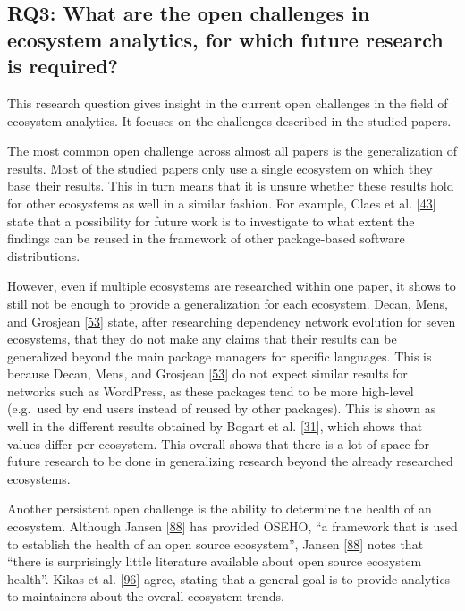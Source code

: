 \documentclass[]{book}
\begin{document}
\subsection{RQ3: What are the open challenges in ecosystem analytics,
for which future research is
required?}\label{rq3-what-are-the-open-challenges-in-ecosystem-analytics-for-which-future-research-is-required}

This research question gives insight in the current open challenges in
the field of ecosystem analytics. It focuses on the challenges described
in the studied papers.

The most common open challenge across almost all papers is the
generalization of results. Most of the studied papers only use a single
ecosystem on which they base their results. This in turn means that it
is unsure whether these results hold for other ecosystems as well in a
similar fashion. For example, Claes et al.
{[}\protect\hyperlink{ref-Claes2015}{43}{]} state that a possibility for
future work is to investigate to what extent the findings can be reused
in the framework of other package-based software distributions.

However, even if multiple ecosystems are researched within one paper, it
shows to still not be enough to provide a generalization for each
ecosystem. Decan, Mens, and Grosjean
{[}\protect\hyperlink{ref-Decan2018}{53}{]} state, after researching
dependency network evolution for seven ecosystems, that they do not make
any claims that their results can be generalized beyond the main package
managers for specific languages. This is because Decan, Mens, and
Grosjean {[}\protect\hyperlink{ref-Decan2018}{53}{]} do not expect
similar results for networks such as WordPress, as these packages tend
to be more high-level (e.g.~used by end users instead of reused by other
packages). This is shown as well in the different results obtained by
Bogart et al. {[}\protect\hyperlink{ref-Bogart2016}{31}{]}, which shows
that values differ per ecosystem. This overall shows that there is a lot
of space for future research to be done in generalizing research beyond
the already researched ecosystems.

Another persistent open challenge is the ability to determine the health
of an ecosystem. Although Jansen
{[}\protect\hyperlink{ref-Jansen2014}{88}{]} has provided OSEHO, ``a
framework that is used to establish the health of an open source
ecosystem'', Jansen {[}\protect\hyperlink{ref-Jansen2014}{88}{]} notes
that ``there is surprisingly little literature available about open
source ecosystem health''. Kikas et al.
{[}\protect\hyperlink{ref-Kikas2017}{96}{]} agree, stating that a
general goal is to provide analytics to maintainers about the overall
ecosystem trends.
\end{document}
